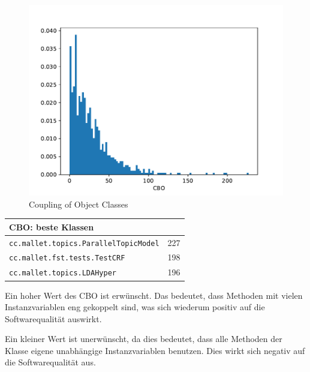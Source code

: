 \documentclass{scrreprt}
\newcommand{\lstx}[1]{\lstinline$#1$}
\begin{document}
\begin{figure}
 \centering
 \includegraphics[width=.8\textwidth]{./CBO.pdf}
 \caption{Coupling of Object Classes}
 \label{abb:cbo}
\end{figure}


\begin{center}
\end{center}


\begin{center}
\begin{tabular}{ll}
\toprule
CBO: beste Klassen\\
\midrule
\lstx{cc.mallet.topics.ParallelTopicModel} & 227 \\
\lstx{cc.mallet.fst.tests.TestCRF} & 198\\
 \lstx{cc.mallet.topics.LDAHyper}&196 \\
\bottomrule
\end{tabular}
\end{center}


Ein hoher Wert des CBO ist erwünscht. Das bedeutet, dass Methoden mit vielen Instanzvariablen eng gekoppelt sind, was sich wiederum positiv auf die Softwarequalität auswirkt.

Ein kleiner Wert ist unerwünscht, da dies bedeutet, dass alle Methoden der Klasse eigene unabhängige Instanzvariablen benutzen. Dies wirkt sich negativ auf die Softwarequalität aus.
\end{document}

